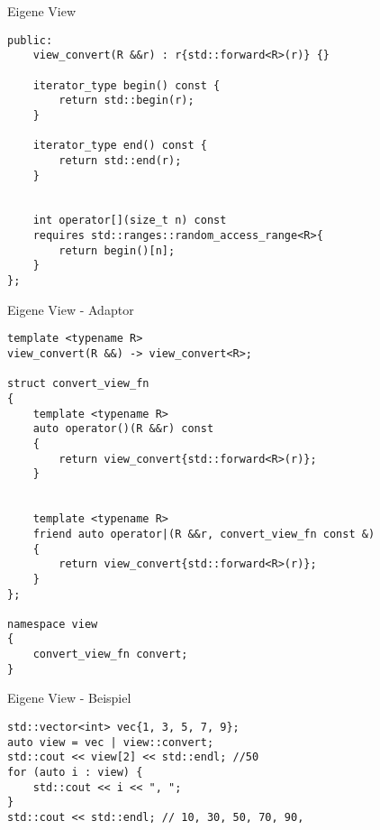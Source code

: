 \begin{frame}{Eigene View}
    \begin{verbatim}
public:
    view_convert(R &&r) : r{std::forward<R>(r)} {}

    iterator_type begin() const {
        return std::begin(r);
    }

    iterator_type end() const {
        return std::end(r);
    }


    int operator[](size_t n) const
    requires std::ranges::random_access_range<R>{
        return begin()[n];
    }
};
    \end{verbatim}
\end{frame}

\begin{frame}{Eigene View - Adaptor}
    \begin{verbatim}
template <typename R>
view_convert(R &&) -> view_convert<R>;

struct convert_view_fn
{
    template <typename R>
    auto operator()(R &&r) const
    {
        return view_convert{std::forward<R>(r)};
    }


    template <typename R>
    friend auto operator|(R &&r, convert_view_fn const &)
    {
        return view_convert{std::forward<R>(r)};
    }
};

namespace view
{
    convert_view_fn convert;
}
    \end{verbatim}
\end{frame}

\begin{frame}{Eigene View - Beispiel}
    \begin{verbatim}
std::vector<int> vec{1, 3, 5, 7, 9};
auto view = vec | view::convert;
std::cout << view[2] << std::endl; //50
for (auto i : view) {
    std::cout << i << ", ";
}
std::cout << std::endl; // 10, 30, 50, 70, 90,
    \end{verbatim}
\end{frame}